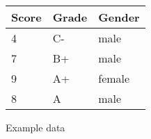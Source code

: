 \begin{figure}[H]
    \centering
    \small
    \begin{tabular}{l l l}
        \toprule
        \textbf{Score} & \textbf{Grade} & \textbf{Gender} \\
        \midrule
        4 & C- & male \\
        7 & B+ & male \\
        9 & A+ & female \\
        8 & A  & male \\
        \bottomrule
    \end{tabular}
    \caption{Example data}\label{fig:unscaled_generalization_cost_example}
\end{figure}